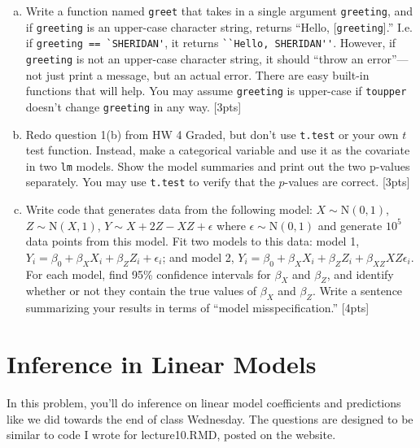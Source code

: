 \documentclass[12pt]{article}
\newcommand{\Norm}{\text{N}}
\begin{document}
\begin{enumerate}[(a)]
	\item Write a function named \verb|greet| that takes in a single argument \verb|greeting|, and if \verb|greeting| is an upper-case character string, returns ``Hello, [\verb|greeting|].'' I.e. if \verb|greeting == `SHERIDAN'|, it returns \verb|``Hello, SHERIDAN''|. However, if \verb|greeting| is not an upper-case character string, it should ``throw an error''---not just print a message, but an actual error. There are easy built-in functions that will help. You may assume \verb|greeting| is upper-case if \verb|toupper| doesn't change \verb|greeting| in any way. [3pts]
	\item Redo question 1(b) from HW 4 Graded, but don't use \verb|t.test| or your own $t$ test function. Instead, make a categorical variable and use it as the covariate in two \verb|lm| models. Show the model summaries and print out the two p-values separately. You may use \verb|t.test| to verify that the $p$-values are correct. [3pts]
	\item Write code that generates data from the following model: $X \sim \Norm(0,1)$, $Z \sim \Norm(X,1)$, $Y \sim X + 2Z - XZ + \epsilon$ where $\epsilon \sim \Norm(0,1)$ and generate $10^5$ data points from this model. Fit two models to this data: model 1, $Y_i = \beta_0 + \beta_X X_i + \beta_Z Z_i + \epsilon_i$; and model 2, $Y_i = \beta_0 + \beta_X X_i + \beta_Z Z_i + \beta_{XZ} XZ \epsilon_i$. For each model, find 95\% confidence intervals for $\beta_X$ and $\beta_Z$, and identify whether or not they contain the true values of $\beta_X$ and $\beta_Z$. Write a sentence summarizing your results in terms of ``model misspecification.'' [4pts]
\end{enumerate}

\section{Inference in Linear Models}

In this problem, you'll do inference on linear model coefficients and predictions like we did towards the end of class Wednesday. The questions are designed to be similar to code I wrote for lecture10.RMD, posted on the website.
\end{document}
